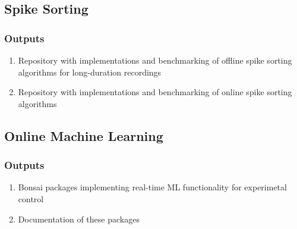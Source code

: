 \documentclass[12pt]{article}
\begin{document}
\subsection{Spike Sorting}

\subsubsection{Outputs}

\begin{enumerate}

    \item Repository with implementations and benchmarking of offline spike
        sorting algorithms for long-duration recordings

    \item Repository with implementations and benchmarking of online spike
        sorting algorithms

\end{enumerate}

\subsection{Online Machine Learning}

\subsubsection{Outputs}

\begin{enumerate}

    \item Bonsai packages implementing real-time ML functionality for experimetal control

    \item Documentation of these packages

\end{enumerate}

\end{document}
